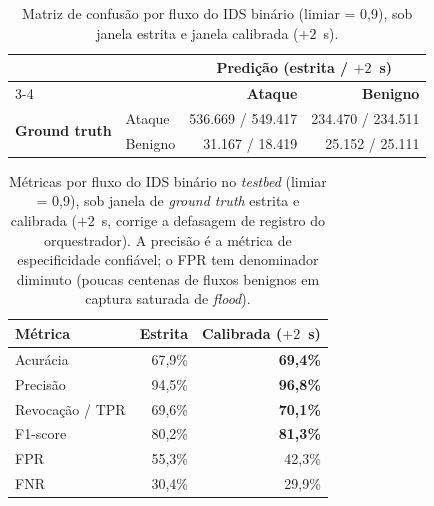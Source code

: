 \documentclass[12pt]{article}
\begin{document}
\begin{table}[ht]
\centering
\caption{Matriz de confusão por fluxo do IDS binário (limiar = 0,9), sob janela
estrita e janela calibrada ($+2$~s).}
\label{tab:bin_cm}
\begin{tabular}{@{}llrr@{}}
\toprule
& & \multicolumn{2}{c}{\textbf{Predição (estrita / \mbox{$+2$~s})}} \\
\cmidrule{3-4}
& & \textbf{Ataque} & \textbf{Benigno} \\ \midrule
\multirow{2}{*}{\textbf{Ground truth}}
  & Ataque  & 536.669 / 549.417 & 234.470 / 234.511 \\
  & Benigno &  31.167 / 18.419 &  25.152 / 25.111 \\ \bottomrule
\end{tabular}
\end{table}

\begin{table}[ht]
\centering
\caption{Métricas por fluxo do IDS binário no \textit{testbed} (limiar = 0,9),
sob janela de \textit{ground truth} estrita e calibrada ($+2$~s, corrige a
defasagem de registro do orquestrador). A precisão é a métrica de especificidade
confiável; o FPR tem denominador diminuto (poucas centenas de fluxos benignos em
captura saturada de \textit{flood}).}
\label{tab:bin_metrics}
\begin{tabular}{@{}lrr@{}}
\toprule
\textbf{Métrica} & \textbf{Estrita} & \textbf{Calibrada ($+2$~s)} \\ \midrule
Acurácia            & 67,9\% & \textbf{69,4\%} \\
Precisão            & 94,5\% & \textbf{96,8\%} \\
Revocação / TPR     & 69,6\% & \textbf{70,1\%} \\
F1-score            & 80,2\% & \textbf{81,3\%} \\
FPR                 & 55,3\% & 42,3\% \\
FNR                 & 30,4\% & 29,9\% \\
\bottomrule
\end{tabular}
\end{table}
\end{document}
